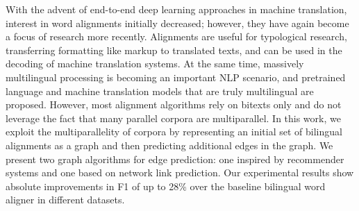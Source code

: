 With the advent of end-to-end deep learning approaches in machine translation, interest in word alignments initially decreased; however, they have again become a focus of research more recently. Alignments are useful for typological research, transferring formatting like markup to translated texts, and can be used in the decoding of machine translation systems. At the same time, massively multilingual processing is becoming an important NLP scenario, and pretrained language and machine translation models that are truly multilingual are proposed. However, most alignment algorithms rely on bitexts only and do not leverage the fact that many parallel corpora are multiparallel. In this work, we exploit the multiparallelity of corpora by representing an initial set of bilingual alignments as a graph and then predicting additional edges in the graph. We present two graph algorithms for edge prediction: one inspired by recommender systems and one based on network link prediction. Our experimental results show absolute improvements in F1 of up to 28\% over the baseline bilingual word aligner in different datasets.
